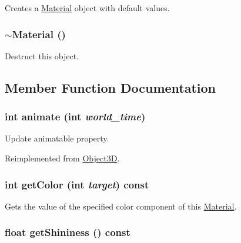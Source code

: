 Creates a \hyperlink{classm3g_1_1Material}{Material} object with default values. \hypertarget{classm3g_1_1Material_b15b7efa255e5cca9b02a031a783cfe8}{
\subsubsection[{$\sim$Material}]{\setlength{\rightskip}{0pt plus 5cm}$\sim${\bf Material} ()}}
\label{classm3g_1_1Material_b15b7efa255e5cca9b02a031a783cfe8}


Destruct this object. 

\subsection{Member Function Documentation}
\hypertarget{classm3g_1_1Material_8aad1ceab4c2a03609c8a42324ce484d}{
\subsubsection[{animate}]{\setlength{\rightskip}{0pt plus 5cm}int animate (int {\em world\_\-time})}}
\label{classm3g_1_1Material_8aad1ceab4c2a03609c8a42324ce484d}


Update animatable property. 

Reimplemented from \hyperlink{classm3g_1_1Object3D_8aad1ceab4c2a03609c8a42324ce484d}{Object3D}.\hypertarget{classm3g_1_1Material_d5740043584c6bf87bf014402c5985be}{
\subsubsection[{getColor}]{\setlength{\rightskip}{0pt plus 5cm}int getColor (int {\em target}) const}}
\label{classm3g_1_1Material_d5740043584c6bf87bf014402c5985be}


Gets the value of the specified color component of this \hyperlink{classm3g_1_1Material}{Material}. \hypertarget{classm3g_1_1Material_1bab082fe3510dbe7b98dd07b3976b5b}{
\subsubsection[{getShininess}]{\setlength{\rightskip}{0pt plus 5cm}float getShininess () const}}
\label{classm3g_1_1Material_1bab082fe3510dbe7b98dd07b3976b5b}


